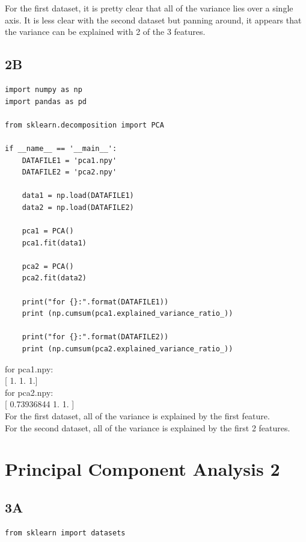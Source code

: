\documentclass[12pt]{article}
\begin{document}
\begin{flushleft}
			For the first dataset, it is pretty clear that all of the variance lies over a single axis. It is less clear with the second dataset but panning around, it appears that the variance can be explained with 2 of the 3 features.\\
		
		\subsection*{2B}
		
			\begin{lstlisting}
import numpy as np 
import pandas as pd

from sklearn.decomposition import PCA

if __name__ == '__main__':
	DATAFILE1 = 'pca1.npy'
	DATAFILE2 = 'pca2.npy'
	
	data1 = np.load(DATAFILE1)
	data2 = np.load(DATAFILE2)
	
	pca1 = PCA()
	pca1.fit(data1)
	
	pca2 = PCA()
	pca2.fit(data2)
	
	print("for {}:".format(DATAFILE1))
	print (np.cumsum(pca1.explained_variance_ratio_))
	
	print("for {}:".format(DATAFILE2))
	print (np.cumsum(pca2.explained_variance_ratio_))
			\end{lstlisting}
			
			for pca1.npy:\\
			{[ 1.  1.  1.]}\\
			for pca2.npy:\\
			{[ 0.73936844  1.          1.        ]}\\
			
			For the first dataset, all of the variance is explained by the first feature.\\
			For the second dataset, all of the variance is explained by the first 2 features.\\
			
		
		\section{Principal Component Analysis 2}
		
		\subsection*{3A}
		
			\begin{lstlisting}
from sklearn import datasets


\end{lstlisting}
\end{flushleft}
\end{document}

